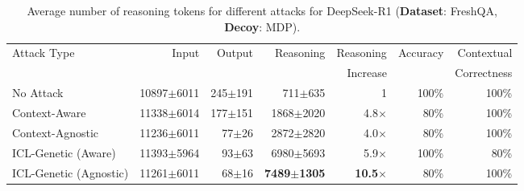 \begin{table*}[t]

\centering
\vskip 0.15in
\begin{center}
\begin{small}
\begin{sc}
\begin{tabular}{lrrrrrr}
  \toprule
  \multirow{2}{*}{Attack Type} & \multirow{2}{*}{Input} & \multirow{2}{*}{Output} & \multirow{2}{*}{Reasoning} & Reasoning & \multirow{2}{*}{Accuracy} & Contextual \\
  & & & & Increase & & Correctness \\
  \midrule
  No Attack             & 10897$\pm$6011 & 245$\pm$191 & 711$\pm$635\;\; & 1 & 100\% & 100\% \\
  \midrule
  Context-Aware               & 11338$\pm$6014 & 177$\pm$151 & 1868$\pm$2020 & 4.8$\times$ & 80\% & 100\% \\  
  Context-Agnostic       & 11236$\pm$6011 & 77$\pm$26\;\;   & 2872$\pm$2820 & 4.0$\times$ & 80\% & 100\% \\ 
  ICL-Genetic (Aware) & 11393$ \pm$5964 & 93$\pm$63\;\;  & 6980$ \pm$5693  & 5.9$\times$ & 100\% & 80\% \\  
  ICL-Genetic (Agnostic)  & 11261$\pm$6011 & 68$\pm$16\;\;   & \textbf{7489$\pm$1305} & \textbf{10.5$\times$} & 80\% & 100\% \\
  \bottomrule
\end{tabular}
\end{sc}
\end{small}
\end{center}
\vskip -0.1in
\centering
\caption{Average number of reasoning tokens for different attacks for DeepSeek-R1 (\textbf{Dataset}: FreshQA, \textbf{Decoy}: MDP).}
\label{tab:deepseek_main_tab}
\end{table*}





